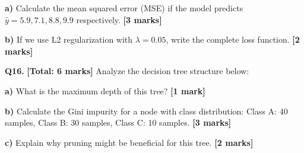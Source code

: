 \documentclass{article}
\begin{document}
\textbf{a)} Calculate the mean squared error (MSE) if the model predicts $\hat{y} = 5.9, 7.1, 8.8, 9.9$ respectively. \textbf{[3 marks]}

\textbf{b)} If we use L2 regularization with $\lambda = 0.05$, write the complete loss function. \textbf{[2 marks]}


\textbf{Q16.} \textbf{[Total: 6 marks]} Analyze the decision tree structure below:

\begin{center}

\end{center}

\textbf{a)} What is the maximum depth of this tree? \textbf{[1 mark]}

\textbf{b)} Calculate the Gini impurity for a node with class distribution: Class A: 40 samples, Class B: 30 samples, Class C: 10 samples. \textbf{[3 marks]}

\textbf{c)} Explain why pruning might be beneficial for this tree. \textbf{[2 marks]}
\end{document}
